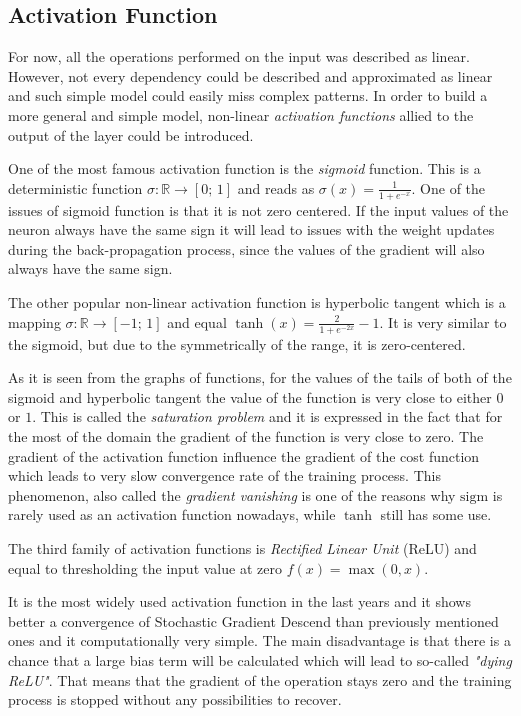 \subsection{Activation Function}

For now, all the operations performed on the input was described as linear.
However, not every dependency could be described and approximated as linear and such simple model could easily miss complex patterns.
In order to build a more general and simple model, non-linear \emph{activation functions} allied to the output of the layer could be introduced.
\medskip

One of the most famous activation function is the \emph{sigmoid} function.
This is a deterministic function $ \sigma : \mathbb{R} \rightarrow [0; \, 1] $ and reads as $ \sigma(x) = \frac{1}{1+e^{-x}} $.
One of the issues of sigmoid function is that it is not zero centered.
If the input values of the neuron always have the same sign it will lead to issues with the weight updates during the back-propagation process, since the values of the gradient will also always have the same sign.
\medskip

The other popular non-linear activation function is hyperbolic tangent which is a mapping $ \sigma : \mathbb{R} \rightarrow [-1; \, 1]$ and equal $\tanh(x)=\frac{2}{1+e^{-2x}}-1$.
It is very similar to the sigmoid, but due to the symmetrically of the range, it is zero-centered.
\medskip

As it is seen from the graphs of functions, for the values of the tails of both of the sigmoid and hyperbolic tangent the value of the function is very close to either $0$ or $1$.
This is called the \emph{saturation problem} and it is expressed in the fact that for the most of the domain the gradient of the function is very close to zero.
The gradient of the activation function influence the gradient of the cost function which leads to very slow convergence rate of the training process.
This phenomenon, also called the \emph{gradient vanishing} is one of the reasons why $\mathrm{sigm}$ is rarely used as an activation function nowadays, while $\tanh$ still has some use.
\medskip

The third family of activation functions is \emph{Rectified Linear Unit} (ReLU) and equal to thresholding the input value at zero $f(x)=\max(0,x)$. 
\medskip

It is the most widely used activation function in the last years and it shows better a convergence of Stochastic Gradient Descend than previously mentioned ones and it computationally very simple.
The main disadvantage is that there is a chance that a large bias term will be calculated which will lead to so-called \emph{"dying ReLU"}. 
That means that the gradient of the operation stays zero and the training process is stopped without any possibilities to recover. 
\medskip

